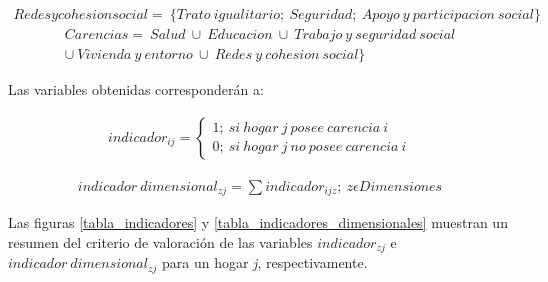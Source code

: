 \documentclass[12pt,letterpaper,spanish]{article}
\begin{document}
\begin{enumerate}
\begin{equation}
\begin{split}
Redes y cohesion social=\:\{ Trato\:igualitario;\:Seguridad;\:Apoyo\:y\:participacion\:social\}
\end{split}
\end{equation}
\begin{equation}
\begin{split}
Carencias=\:Salud\:\cup\:Educacion\:\cup\:Trabajo\:y\:seguridad\:social\\
\cup\:Vivienda\:y\:entorno\:\cup\:Redes\:y\:cohesion\:social\}
\end{split}
\end{equation}





Las variables obtenidas corresponderán a:


\begin{equation} \label{indicador}
\begin{split}
indicador_{ij}= \begin{cases}
        1;\:si\:hogar\:j\:posee\:carencia\:i\\
        0;\:si\:hogar\:j\:no\:posee\:carencia\:i
        \end{cases}
\end{split}
\end{equation}



\begin{equation} \label{indicador agregado}
\begin{split}
indicador\:dimensional_{zj}=\sum indicador_{ijz};\:z\epsilon Dimensiones
\end{split}
\end{equation}



Las figuras \ref{tabla_indicadores} y \ref{tabla_indicadores_dimensionales} muestran un resumen del criterio de valoración de las variables $indicador_{zj}$ e $indicador\:dimensional_{zj}$ para un hogar \textit{j}, respectivamente. 



\end{enumerate}
\end{document}
